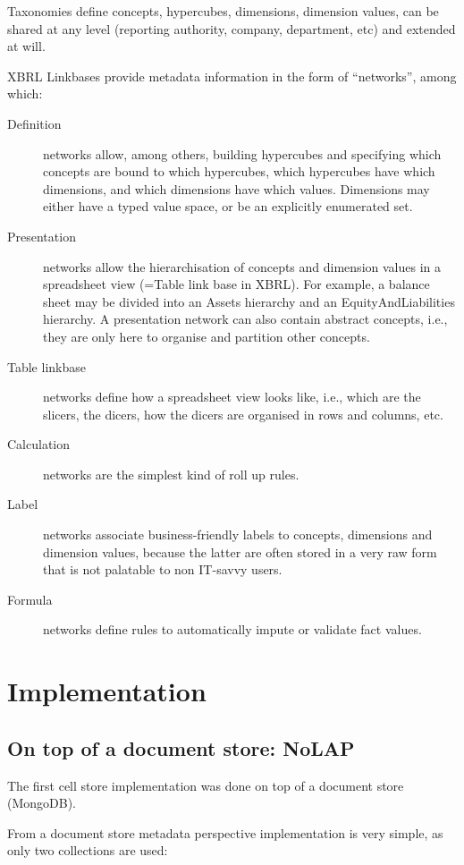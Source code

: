 \documentclass{vldb}
\begin{document}
Taxonomies define concepts, hypercubes, dimensions, dimension values, can be shared at any level (reporting authority, company, department, etc) and extended at will.

XBRL Linkbases provide metadata information in the form of ``networks'', among which:

\begin{description}
\item[Definition] networks allow, among others, building hypercubes and specifying which concepts are bound to which hypercubes, which hypercubes have which dimensions, and which dimensions have which values. Dimensions may either have a typed value space, or be an explicitly enumerated set. 
\item[Presentation] networks allow the hierarchisation of concepts and dimension values in a spreadsheet view (=Table link base in XBRL). For example, a balance sheet may be divided into an Assets hierarchy and an EquityAndLiabilities hierarchy. A presentation network can also contain abstract concepts, i.e., they are only here to organise and partition other concepts. 
\item[Table linkbase] networks define how a spreadsheet view looks like, i.e., which are the slicers, the dicers, how the dicers are organised in rows and columns, etc.
\item[Calculation] networks are the simplest kind of roll up rules.
\item[Label] networks associate business-friendly labels to concepts, dimensions and dimension values, because the latter are often stored in a very raw form that is not palatable to non IT-savvy users.
\item[Formula] networks define rules to automatically impute or validate fact values.
\end{description}

\section{Implementation}
\label{section-implementation}

\subsection{On top of a document store: NoLAP}

The first cell store implementation was done on top of a document store (MongoDB).

From a document store metadata perspective implementation is very simple, as only two collections are used:
\end{document}

